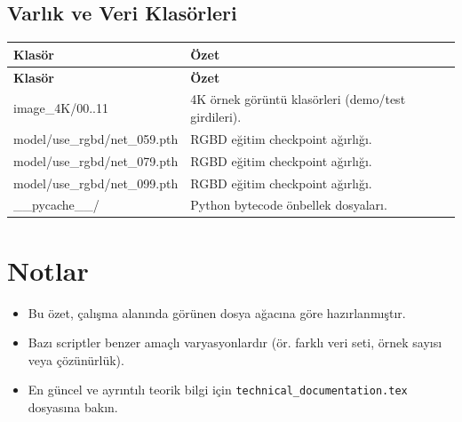 \documentclass[11pt,a4paper]{article}
\begin{document}
\subsection*{Varlık ve Veri Klasörleri}
\begin{longtable}{|p{}|p{}|}
\hline
\textbf{Klasör} & \textbf{Özet} \\
\hline
\endfirsthead
\hline
\textbf{Klasör} & \textbf{Özet} \\
\hline
\endhead

image_4K/00..11 & 4K örnek görüntü klasörleri (demo/test girdileri). \\
\hline
model/use_rgbd/net_059.pth & RGBD eğitim checkpoint ağırlığı. \\
\hline
model/use_rgbd/net_079.pth & RGBD eğitim checkpoint ağırlığı. \\
\hline
model/use_rgbd/net_099.pth & RGBD eğitim checkpoint ağırlığı. \\
\hline
__pycache__/ & Python bytecode önbellek dosyaları. \\
\hline
\end{longtable}

\section*{Notlar}
\begin{itemize}
    \item Bu özet, çalışma alanında görünen dosya ağacına göre hazırlanmıştır.
    \item Bazı scriptler benzer amaçlı varyasyonlardır (ör. farklı veri seti, örnek sayısı veya çözünürlük).
    \item En güncel ve ayrıntılı teorik bilgi için \texttt{technical\_documentation.tex} dosyasına bakın.
\end{itemize}
\end{document}
